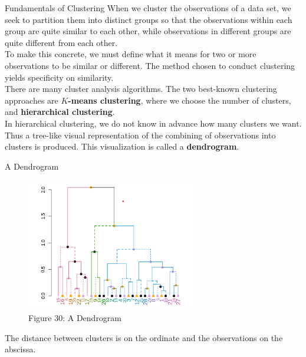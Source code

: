\documentclass[pdf]{beamer}
\newcommand{\empr}[1]{{\color{franklinblue}\textbf{#1}}}
\theoremstyle{remark}
\theoremstyle{definition}
\begin{document}
\begin{frame}[t]{Fundamentals of Clustering}
When we cluster the observations of a data set, we seek to partition them into distinct groups so that the observations within each group are quite similar to each other, while observations in different groups are quite different from each other. \\
\vspace{1.5ex}
To make this concrete, we must define what it means for two or more observations to be similar or different. The method chosen to conduct clustering yields specificity on similarity. \\
\vspace{1.5ex}
There are many cluster analysis algorithms. The two best-known clustering approaches are \empr{$K$-means clustering}, where we choose the number of clusters, and \empr{hierarchical clustering}. \\
\vspace{1.5ex}
In hierarchical clustering, we do not know in advance how many clusters we want. Thus a tree-like visual representation of the combining of observations into clusters is produced. This visualization is called a \empr{dendrogram}. 
\end{frame}

\begin{frame}[t]{A Dendrogram}
\begin{figure}[htbp]
  \captionsetup{justification=centering}
  \includegraphics[height=5.8cm, trim=0.0cm 0.0cm 0.0cm 0.0cm width=5.8cm]{Images/Dendrogram_Example.png}
  \caption{Figure {\color{franklinblue} 30}: A Dendrogram}
\end{figure}
\vspace{-2.0ex}
The distance between clusters is on the ordinate and the observations on the abscissa.
\end{frame}
\end{document}
